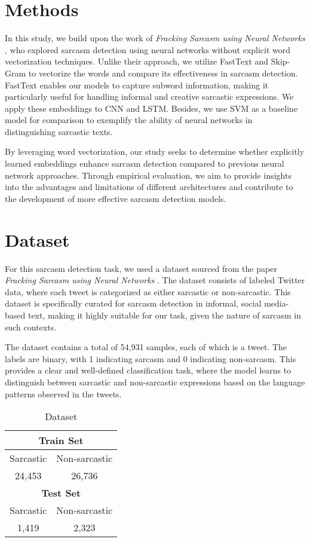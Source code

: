 \documentclass[11pt]{article}
\begin{document}
\section{Methods}
In this study, we build upon the work of \emph{Fracking Sarcasm using Neural Networks} \cite{ghosh2016magnets}, who explored sarcasm detection using neural networks without explicit word vectorization techniques. Unlike their approach, we utilize FastText and Skip-Gram to vectorize the words and compare its effectiveness in sarcasm detection. FastText enables our models to capture subword information, making it particularly useful for handling informal and creative sarcastic expressions. We apply these embeddings to CNN and LSTM. Besides, we use SVM as a baseline model for comparison to exemplify the ability of neural networks in distinguishing sarcastic texts.

By leveraging word vectorization, our study seeks to determine whether explicitly learned embeddings enhance sarcasm detection compared to previous neural network approaches. Through empirical evaluation, we aim to provide insights into the advantages and limitations of different architectures and contribute to the development of more effective sarcasm detection models.

\section{Dataset}
For this sarcasm detection task, we used a dataset sourced from the paper \emph{Fracking Sarcasm using Neural Networks} \cite{ghosh2016magnets}. The dataset consists of labeled Twitter data, where each tweet is categorized as either sarcastic or non-sarcastic. This dataset is specifically curated for sarcasm detection in informal, social media-based text, making it highly suitable for our task, given the nature of sarcasm in such contexts.

The dataset contains a total of 54,931 samples, each of which is a tweet. The labels are binary, with 1 indicating sarcasm and 0 indicating non-sarcasm. This provides a clear and well-defined classification task, where the model learns to distinguish between sarcastic and non-sarcastic expressions based on the language patterns observed in the tweets.

\begin{table}[ht]
\centering
\begin{tabular}{|c|c|}
\hline
\multicolumn{2}{|c|}{\textbf{Train Set}} \\ \hline
Sarcastic & Non-sarcastic \\ \hline
24,453 & 26,736 \\ \hline
\multicolumn{2}{|c|}{\textbf{Test Set}} \\ \hline
Sarcastic & Non-sarcastic \\ \hline
1,419 & 2,323 \\ \hline
\end{tabular}
\caption{Dataset}
\end{table}
\end{document}
